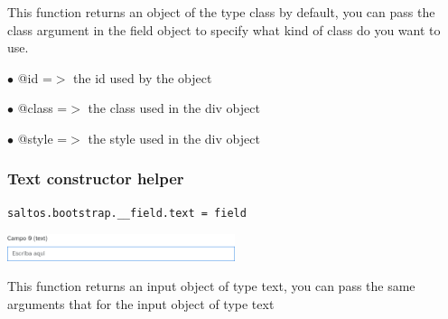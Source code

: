 \documentclass[a4paper]{article}
\begin{document}
This function returns an object of the type class by default, you can pass the class
argument in the field object to specify what kind of class do you want to use.

\begin{compactitem}
\item[\color{myblue}$\bullet$] @id    =$>$ the id used by the object
\item[\color{myblue}$\bullet$] @class =$>$ the class used in the div object
\item[\color{myblue}$\bullet$] @style =$>$ the style used in the div object
\end{compactitem}

\hypertarget{toc50}{}
\subsubsection{Text constructor helper}

\begin{lstlisting}
saltos.bootstrap.__field.text = field
\end{lstlisting}

\begin{center}\includegraphics[width=0.5\textwidth]{../ujest/snaps/test-bootstrap-js-bootstrap-campo-0-text-1-snap.png}\end{center}

This function returns an input object of type text, you can pass the same arguments
that for the input object of type text
\end{document}
